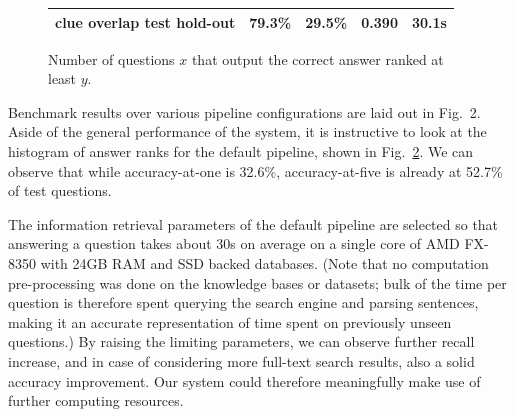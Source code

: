 \documentclass{poster15}
\begin{document}
\begin{figure}[t]
\begin{tabular}{|c|cccc|}
clue overlap test hold-out & 79.3\% & 29.5\% & 0.390 & 30.1s \\
\hline
\end{tabular}
\vspace*{-0.2cm}
\label{fig:bench}
\end{figure}

\begin{figure}[t]
\begin{center}
\vspace*{-0.75cm}
\caption{Number of questions $x$ that output the correct answer ranked at least $y$.}
\label{fig:ranks}
\end{center}
\end{figure}%

Benchmark results over various pipeline configurations are laid out in Fig.~2. %
Aside of the general performance of the system,
it is instructive to look at the histogram of answer ranks
for the default pipeline, shown in Fig.~\ref{fig:ranks}.
We can observe that while accuracy-at-one is 32.6\%,
accuracy-at-five is already at 52.7\% of test questions.

The information retrieval parameters of the default pipeline are selected so
that answering a question takes about 30s on average on a single core of
AMD FX-8350 with 24GB RAM and SSD backed databases.
(Note that no computation pre-processing was done on the knowledge bases or datasets;
bulk of the time per question is therefore spent querying the search engine and parsing sentences,
making it an accurate representation of time spent on previously unseen questions.)
By raising the limiting
parameters, we can observe further recall increase, and in case of considering
more full-text search results, also a solid accuracy improvement.  Our system
could therefore meaningfully make use of further computing resources.
\end{document}
